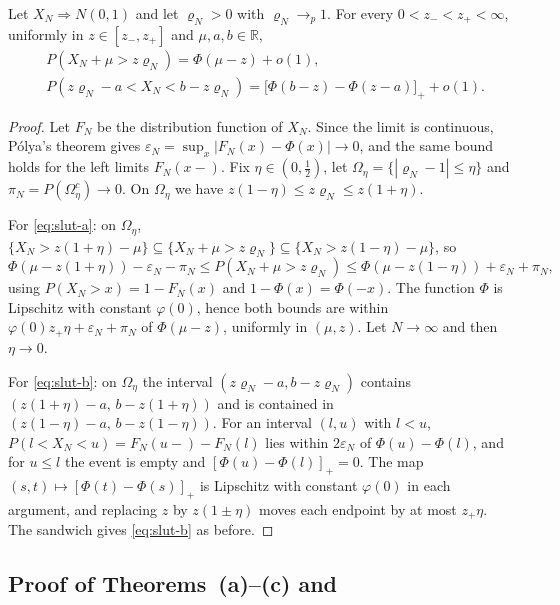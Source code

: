 \begin{lemma}\label{lem:slutsky}
Let $X_N\Rightarrow N(0,1)$ and let $\varrho_N>0$ with $\varrho_N\to_p1$. For every $0<z_-<z_+<\infty$, uniformly in $z\in[z_-,z_+]$ and $\mu,a,b\in\mathbb R$,
\begin{align}
&P(X_N+\mu>z\varrho_N)=\Phi(\mu-z)+o(1),\label{eq:slut-a}\\
&P(z\varrho_N-a<X_N<b-z\varrho_N)=\big[\Phi(b-z)-\Phi(z-a)\big]_++o(1).\label{eq:slut-b}
\end{align}
\end{lemma}
\begin{proof}
Let $F_N$ be the distribution function of $X_N$. Since the limit is continuous, P\'olya's theorem \citep[Lemma~2.11]{vandervaart1998} gives $\varepsilon_N=\sup_x|F_N(x)-\Phi(x)|\to0$, and the same bound holds for the left limits $F_N(x-)$. Fix $\eta\in(0,\tfrac12)$, let $\Omega_\eta=\{|\varrho_N-1|\le\eta\}$ and $\pi_N=P(\Omega_\eta^c)\to0$. On $\Omega_\eta$ we have $z(1-\eta)\le z\varrho_N\le z(1+\eta)$.

For \eqref{eq:slut-a}: on $\Omega_\eta$, $\{X_N>z(1+\eta)-\mu\}\subseteq\{X_N+\mu>z\varrho_N\}\subseteq\{X_N>z(1-\eta)-\mu\}$, so
\[
\Phi(\mu-z(1+\eta))-\varepsilon_N-\pi_N\le P(X_N+\mu>z\varrho_N)\le\Phi(\mu-z(1-\eta))+\varepsilon_N+\pi_N,
\]
using $P(X_N>x)=1-F_N(x)$ and $1-\Phi(x)=\Phi(-x)$. The function $\Phi$ is Lipschitz with constant $\varphi(0)$, hence both bounds are within $\varphi(0)z_+\eta+\varepsilon_N+\pi_N$ of $\Phi(\mu-z)$, uniformly in $(\mu,z)$. Let $N\to\infty$ and then $\eta\to0$.

For \eqref{eq:slut-b}: on $\Omega_\eta$ the interval $(z\varrho_N-a,b-z\varrho_N)$ contains $(z(1+\eta)-a,\,b-z(1+\eta))$ and is contained in $(z(1-\eta)-a,\,b-z(1-\eta))$. For an interval $(l,u)$ with $l<u$, $P(l<X_N<u)=F_N(u-)-F_N(l)$ lies within $2\varepsilon_N$ of $\Phi(u)-\Phi(l)$, and for $u\le l$ the event is empty and $[\Phi(u)-\Phi(l)]_+=0$. The map $(s,t)\mapsto[\Phi(t)-\Phi(s)]_+$ is Lipschitz with constant $\varphi(0)$ in each argument, and replacing $z$ by $z(1\pm\eta)$ moves each endpoint by at most $z_+\eta$. The sandwich gives \eqref{eq:slut-b} as before.
\end{proof}

\subsection{Proof of Theorems~(a)--(c) and }\label{si:testing-size}

